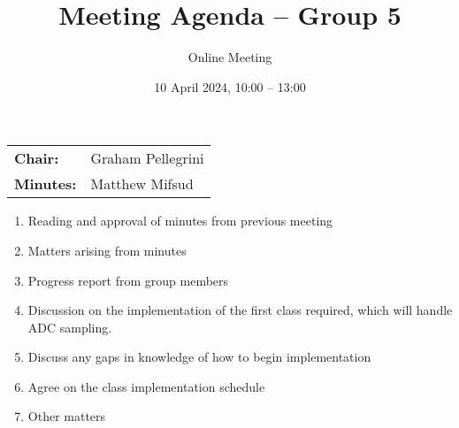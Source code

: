 \documentclass{cce2014-meetings}
\title{Meeting Agenda -- Group 5}
\author{Online Meeting}
\date{10 April 2024, 10:00 -- 13:00}
\begin{document}
\maketitle
\begin{center}
\begin{tabular}{ll}
\textbf{Chair:}   & Graham Pellegrini \\
\textbf{Minutes:} & Matthew Mifsud
\end{tabular}
\end{center}

\begin{enumerate}

\item Reading and approval of minutes from previous meeting

\item Matters arising from minutes

\item Progress report from group members

\item Discussion on the implementation of the first class required, which will handle ADC sampling.

\item Discuss any gaps in knowledge of how to begin implementation

\item Agree on the class implementation schedule


\item Other matters

\end{enumerate}
\end{document}

